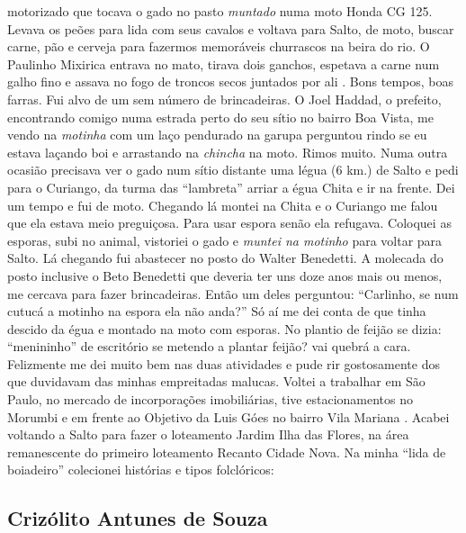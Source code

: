 \documentclass[12pt,brazil,]{book}
\begin{document}
motorizado que tocava o gado no pasto \emph{muntado} numa moto Honda CG
125. Levava os peões para lida com seus cavalos e voltava para Salto, de
moto, buscar carne, pão e cerveja para fazermos memoráveis churrascos na
beira do rio. O Paulinho Mixirica entrava no mato, tirava dois ganchos,
espetava a carne num galho fino e assava no fogo de troncos secos
juntados por ali . Bons tempos, boas farras. Fui alvo de um sem número
de brincadeiras. O Joel Haddad, o prefeito, encontrando comigo numa
estrada perto do seu sítio no bairro Boa Vista, me vendo na
\emph{motinha} com um laço pendurado na garupa perguntou rindo se eu
estava laçando boi e arrastando na \emph{chincha} na moto. Rimos muito.
Numa outra ocasião precisava ver o gado num sítio distante uma légua (6
km.) de Salto e pedi para o Curiango, da turma das ``lambreta'' arriar a
égua Chita e ir na frente. Dei um tempo e fui de moto. Chegando lá
montei na Chita e o Curiango me falou que ela estava meio preguiçosa.
Para usar espora senão ela refugava. Coloquei as esporas, subi no
animal, vistoriei o gado e \emph{muntei na motinho} para voltar para
Salto. Lá chegando fui abastecer no posto do Walter Benedetti. A
molecada do posto inclusive o Beto Benedetti que deveria ter uns doze
anos mais ou menos, me cercava para fazer brincadeiras. Então um deles
perguntou: ``Carlinho, se num cutucá a motinho na espora ela não anda?''
Só aí me dei conta de que tinha descido da égua e montado na moto com
esporas. No plantio de feijão se dizia: ``menininho'' de escritório se
metendo a plantar feijão? vai quebrá a cara. Felizmente me dei muito bem
nas duas atividades e pude rir gostosamente dos que duvidavam das minhas
empreitadas malucas. Voltei a trabalhar em São Paulo, no mercado de
incorporações imobiliárias, tive estacionamentos no Morumbi e em frente
ao Objetivo da Luis Góes no bairro Vila Mariana . Acabei voltando a
Salto para fazer o loteamento Jardim Ilha das Flores, na área
remanescente do primeiro loteamento Recanto Cidade Nova. Na minha ``lida
de boiadeiro'' colecionei histórias e tipos folclóricos:

\subsection{Crizólito Antunes de
Souza}\label{crizuxf3lito-antunes-de-souza}
\end{document}
